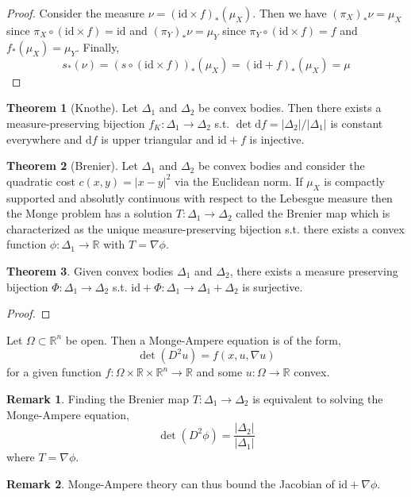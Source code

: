 \documentclass[12pt]{extarticle}
\newcommand{\R}{\mathbb{R}}
\newcommand{\id}{\mathrm{id}}
\theoremstyle{definition}
\newtheorem{theorem}{Theorem}[section]
\newtheorem{remark}{Remark}
\newenvironment{definition}[1][Definition:]{\begin{trivlist}
\item[\hskip \labelsep {\bfseries #1}]}{\end{trivlist}}
\renewcommand{\d}[1]{\mathrm{d} #1}
\begin{document}
\begin{proof}
Consider the measure $\nu = (\id \times f)_*(\mu_X)$. Then we have $(\pi_X)_* \nu = \mu_X$ since $\pi_X \circ (\id \times f) = \id$ and $(\pi_Y)_* \nu = \mu_Y$ since $\pi_Y \circ (\id \times f) = f$ and $f_*(\mu_X) = \mu_Y$. Finally, 
\[ s_*(\nu) = (s \circ (\id \times f))_*(\mu_X) = (\id + f)_* (\mu_X) = \mu \]
\end{proof}

\begin{theorem}[Knothe]
Let $\Delta_1$ and $\Delta_2$ be convex bodies. Then there exists a measure-preserving bijection $f_K : \Delta_1 \to \Delta_2$ s.t. $\det{\d{f}} = |\Delta_2|/|\Delta_1|$ is constant everywhere and $\d{f}$ is upper triangular and $\id + f$ is injective. 
\end{theorem}

\begin{theorem}[Brenier]
Let $\Delta_1$ and $\Delta_2$ be convex bodies and consider the quadratic cost $c(x,y) = |x - y|^2$ via the Euclidean norm. If $\mu_X$ is compactly supported and absolutly continuous with respect to the Lebesgue measure then the Monge problem has a solution $T : \Delta_1 \to \Delta_2$ called the Brenier map which is characterized as the unique measure-preserving bijection s.t. there exists a convex function $\phi : \Delta_1 \to \R$ with $T = \nabla  \phi$. 
\end{theorem}

\begin{theorem}
Given convex bodies $\Delta_1$ and $\Delta_2$, there exists a measure preserving bijection $\Phi : \Delta_1 \to \Delta_2$ s.t. $\id + \Phi : \Delta_1 \to \Delta_1 + \Delta_2$ is surjective.
\end{theorem}

\begin{proof}

\end{proof}

\begin{definition}
Let $\Omega \subset \R^n$ be open. Then a Monge-Ampere equation is of the form,
\[ \det{(D^2 u)} = f(x, u, \nabla u) \]
for a given function $f : \Omega \times \R \times \R^n \to \R$ and some $u : \Omega \to \R$ convex. 
\end{definition}

\begin{remark}
Finding the Brenier map $T : \Delta_1 \to \Delta_2$ is equivalent to solving the Monge-Ampere equation,
\[ \det{(D^2 \phi)} = \frac{|\Delta_2|}{|\Delta_1|} \]
where $T = \nabla \phi$. 
\end{remark}

\begin{remark}
Monge-Ampere theory can thus bound the Jacobian of $\id + \nabla \phi$. 
\end{remark}
\end{document}
